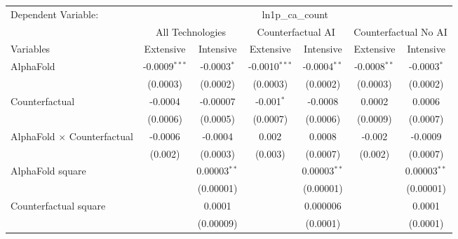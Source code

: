 \begingroup
\centering
\begin{tabular}{lcccccc}
   \tabularnewline \midrule \midrule
   Dependent Variable: & \multicolumn{6}{c}{ln1p\_ca\_count}\\
 & \multicolumn{2}{c}{All Technologies} & \multicolumn{2}{c}{Counterfactual AI} & \multicolumn{2}{c}{Counterfactual No AI} \\
\cmidrule(lr){1-1}\cmidrule(lr){2-3} \cmidrule(lr){4-5} \cmidrule(lr){6-7}
Variables & \multicolumn{1}{c}{Extensive} & \multicolumn{1}{c}{Intensive} & \multicolumn{1}{c}{Extensive} & \multicolumn{1}{c}{Intensive} & \multicolumn{1}{c}{Extensive} & \multicolumn{1}{c}{Intensive} \\
\cmidrule(lr){1-1}\cmidrule(lr){2-2} \cmidrule(lr){3-3} \cmidrule(lr){4-4} \cmidrule(lr){5-5} \cmidrule(lr){6-6} \cmidrule(lr){7-7}
   AlphaFold                          & -0.0009$^{***}$ & -0.0003$^{*}$  & -0.0010$^{***}$ & -0.0004$^{**}$ & -0.0008$^{**}$ & -0.0003$^{*}$\\   
                                      & (0.0003)        & (0.0002)       & (0.0003)        & (0.0002)       & (0.0003)       & (0.0002)\\   
   Counterfactual                     & -0.0004         & -0.00007       & -0.001$^{*}$    & -0.0008        & 0.0002         & 0.0006\\   
                                      & (0.0006)        & (0.0005)       & (0.0007)        & (0.0006)       & (0.0009)       & (0.0007)\\   
   AlphaFold $\times$ Counterfactual  & -0.0006         & -0.0004        & 0.002           & 0.0008         & -0.002         & -0.0009\\   
                                      & (0.002)         & (0.0003)       & (0.003)         & (0.0007)       & (0.002)        & (0.0007)\\   
   AlphaFold square                   &                 & 0.00003$^{**}$ &                 & 0.00003$^{**}$ &                & 0.00003$^{**}$\\   
                                      &                 & (0.00001)      &                 & (0.00001)      &                & (0.00001)\\   
   Counterfactual square              &                 & 0.0001         &                 & 0.000006       &                & 0.0001\\   
                                      &                 & (0.00009)      &                 & (0.0001)       &                & (0.0001)\\   

\end{tabular}
